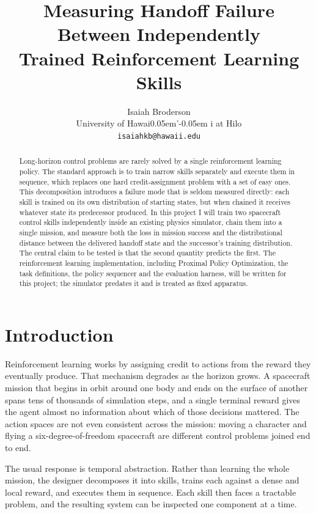 \documentclass[11pt]{article}
\title{\textbf{Measuring Handoff Failure Between Independently\\ Trained Reinforcement Learning Skills}}
\author{%
  Isaiah Broderson\\
  University of Hawai\kern0.05em'\kern-0.05em i at Hilo\\
  \texttt{isaiahkb@hawaii.edu}
}
\date{}
\begin{document}
\maketitle

\begin{abstract}
\noindent
Long-horizon control problems are rarely solved by a single reinforcement learning
policy. The standard approach is to train narrow skills separately and execute them
in sequence, which replaces one hard credit-assignment problem with a set of easy
ones. This decomposition introduces a failure mode that is seldom measured directly:
each skill is trained on its own distribution of starting states, but when chained it
receives whatever state its predecessor produced. In this project I will train two
spacecraft control skills independently inside an existing physics simulator, chain
them into a single mission, and measure both the loss in mission success and the
distributional distance between the delivered handoff state and the successor's
training distribution. The central claim to be tested is that the second quantity
predicts the first. The reinforcement learning implementation, including Proximal
Policy Optimization, the task definitions, the policy sequencer and the evaluation
harness, will be written for this project; the simulator predates it and is treated
as fixed apparatus.
\end{abstract}

\section{Introduction}

Reinforcement learning works by assigning credit to actions from the reward they
eventually produce. That mechanism degrades as the horizon grows. A spacecraft
mission that begins in orbit around one body and ends on the surface of another
spans tens of thousands of simulation steps, and a single terminal reward gives the
agent almost no information about which of those decisions mattered. The action
spaces are not even consistent across the mission: moving a character and flying a
six-degree-of-freedom spacecraft are different control problems joined end to end.

The usual response is temporal abstraction. Rather than learning the whole mission,
the designer decomposes it into skills, trains each against a dense and local reward,
and executes them in sequence. Each skill then faces a tractable problem, and the
resulting system can be inspected one component at a time.
\end{document}
